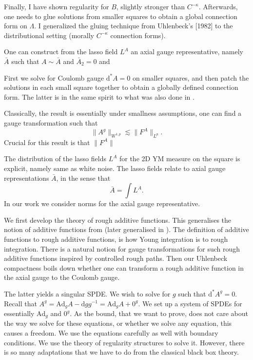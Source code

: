 \documentclass[11pt]{article}
\numberwithin{equation}{section}
\theoremstyle{definition}
\theoremstyle{remark}
\newcommand{\Ad}{\mathrm{Ad}}
\newcommand{\diff}{\mathrm{d}}
\newcommand{\1}{\mathbf 1}
\newcommand{\<}{\langle}
\renewcommand{\>}{\rangle}
\begin{document}
Finally, I have shown regularity for $B$, slightly stronger than $C^{-\kappa}$. Afterwards, one needs to glue solutions from smaller squares to obtain a global connection form on $\Lambda$. I generalized the gluing technique from Uhlenbeck's [1982] to the distributional setting (morally $C^{-\kappa}$ connection forms).


\newpage 



One can construct from the lasso field $L^A$ an axial gauge representative, namely $\bar A$ such that $A\sim \bar A$ and $\bar A_2=0$ and  






First we solve for Coulomb gauge $\diff^*A=0$ on smaller squares, and then patch the solutions in each small square together to obtain a globally defined connection form. The latter is in the same spirit to what was also done in \cite{Uhlenbeck82}. 


Classically, the result is essentially under smallness assumptions, one can find a gauge transformation such that 
\[
\|A^g\|_{W^{1,p}}\lesssim \|F^A\|_{L^p}.
\]
Crucial for this result is that $\|F^A\|$



The distribution of the lasso fields $L^A$ for the 2D YM measure on the square is explicit, namely same as white noise. The lasso fields relate to axial gauge representations $\bar A$, in the sense that 
\[
\bar A=\int L^A. 
\]
In our work we consider norms for the axial gauge representative. 

We first develop the theory of rough additive functions. This generalises the notion of additive functions from \cite{Chevyrev19} (later generalised in \cite{CCHS2d}). The definition of additive functions to rough additive functions, is how Young integration is to rough integration. There is a natural notion for gauge transformations for such rough additive functions inspired by controlled rough paths. Then our Uhlenbeck compactness boils down whether one can transform a rough additive function in the axial gauge to the Coulomb gauge. 

The latter yields a singular SPDE. We wish to solve for $g$ such that $\diff^*A^g=0$. Recall that $A^g=\Ad_gA-\diff gg^{-1}=\Ad_gA+0^g$. We set up a system of SPDEs for essentially $\Ad_g$ and $0^g$. As the bound, that we want to prove, does not care about the way we solve for these equations, or whether we solve any equation, this causes a freedom. We use the equations carefully as well with boundary conditions. We use the theory of regularity structures to solve it. However, there is so many adaptations that we have to do from the classical black box theory. 
\end{document}
